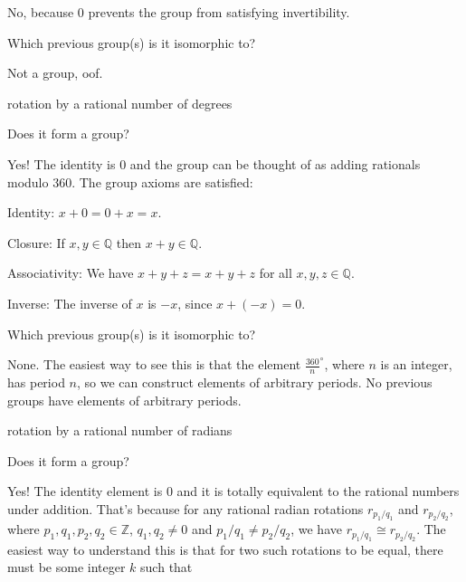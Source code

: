 \documentclass[../key.tex]{subfiles}
\begin{document}
\noindent No, because $0$ prevents the group from satisfying invertibility.

\begin{iinner_problem}
\item Which previous group(s) is it isomorphic to?
\end{iinner_problem}

\noindent Not a group, oof.

\begin{inner_problem}
\item rotation by a rational number of degrees
\end{inner_problem}

\begin{iinner_problem}[start=1]
\item Does it form a group?
\end{iinner_problem}

\noindent Yes! The identity is $0$ and the group can be thought of as adding rationals modulo $360$. The group axioms are satisfied:

Identity: $x+0=0+x=x$.

Closure: If $x,y\in\mathbb{Q}$ then $x+y\in \mathbb{Q}$.

Associativity: We have $x+y+z=x+y+z$ for all $x,y,z \in \mathbb{Q}$.

Inverse: The inverse of $x$ is $-x$, since $x+(-x)=0$.

\begin{iinner_problem}
\item Which previous group(s) is it isomorphic to?
\end{iinner_problem}

\noindent None. The easiest way to see this is that the element $\frac{360}{n}^\circ$, where $n$ is an integer, has period $n$, so we can construct elements of arbitrary periods. No previous groups have elements of arbitrary periods.

\begin{inner_problem}
\item rotation by a rational number of radians
\end{inner_problem}

\begin{iinner_problem}[start=1]
\item Does it form a group?
\end{iinner_problem}

\noindent Yes! The identity element is $0$ and it is totally equivalent to the rational numbers under addition. That's because for any rational radian rotations $r_{p_1/q_1}$ and $r_{p_2/q_2}$, where $p_1,q_1,p_2,q_2\in \mathbb{Z}$, $q_1,q_2\neq 0$ and $p_1/q_1\neq p_2/q_2$, we have $r_{p_1/q_1}\cong r_{p_2/q_2}$. The easiest way to understand this is that for two such rotations to be equal, there must be some integer $k$ such that
\end{document}
